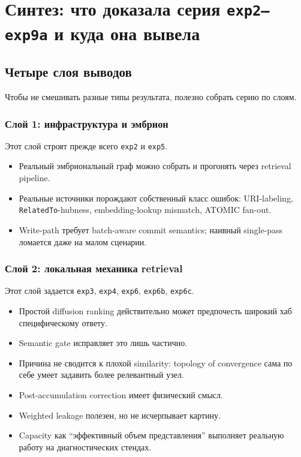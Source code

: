 \chapter{Синтез: что доказала серия \texttt{exp2--exp9a} и куда она вывела}

\section{Четыре слоя выводов}

Чтобы не смешивать разные типы результата, полезно собрать серию по слоям.

\subsection{Слой 1: инфраструктура и эмбрион}

Этот слой строят прежде всего \texttt{exp2} и \texttt{exp5}.

\begin{itemize}[leftmargin=2em]
\item Реальный эмбриональный граф можно собрать и прогонять через retrieval
pipeline.
\item Реальные источники порождают собственный класс ошибок: URI-labeling,
\texttt{RelatedTo}-hubness, embedding-lookup mismatch, ATOMIC fan-out.
\item Write-path требует batch-aware commit semantics; наивный single-pass
ломается даже на малом сценарии.
\end{itemize}

\subsection{Слой 2: локальная механика retrieval}

Этот слой задается \texttt{exp3}, \texttt{exp4}, \texttt{exp6}, \texttt{exp6b},
\texttt{exp6c}.

\begin{itemize}[leftmargin=2em]
\item Простой diffusion ranking действительно может предпочесть широкий хаб
специфическому ответу.
\item Semantic gate исправляет это лишь частично.
\item Причина не сводится к плохой similarity: topology of convergence сама по
себе умеет задавить более релевантный узел.
\item Post-accumulation correction имеет физический смысл.
\item Weighted leakage полезен, но не исчерпывает картину.
\item Capacity как ``эффективный объем представления'' выполняет реальную
работу на диагностических стендах.
\end{itemize}

